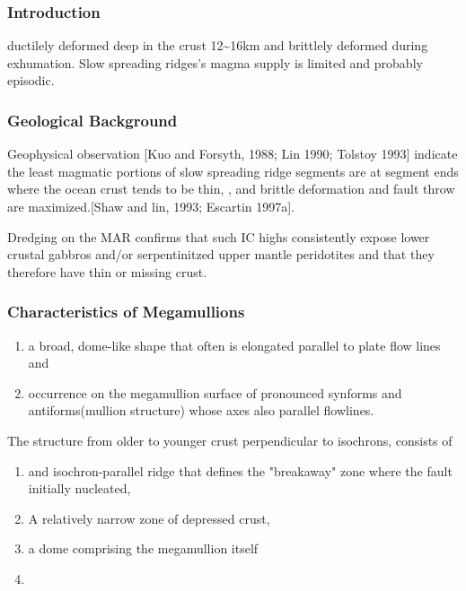 \documentclass[11pt]{article}
\begin{document}
\subsubsection{Introduction}
\label{sec-1-2-1}
ductilely deformed deep in the crust 12\textasciitilde{}16km and brittlely deformed during exhumation.
Slow spreading ridges's magma supply is limited and probably episodic.
\subsubsection{Geological Background}
\label{sec-1-2-2}
Geophysical observation [Kuo and Forsyth, 1988; Lin 1990; Tolstoy 1993] indicate the least magmatic portions of slow spreading ridge segments are at segment ends where the ocean crust tends to be thin, , and brittle deformation and fault throw are maximized.[Shaw and lin, 1993; Escartin 1997a].

Dredging on the MAR confirms that such IC highs consistently expose lower crustal gabbros and/or serpentinitzed upper mantle peridotites and that they therefore have thin or missing crust.
\subsubsection{Characteristics of Megamullions}
\label{sec-1-2-3}
\begin{enumerate}
\item a broad, dome-like shape that often is elongated parallel to plate flow lines and
\item occurrence on the megamullion surface of pronounced synforms and antiforms(mullion structure) whose axes also parallel flowlines. 
\end{enumerate}
The structure from older to younger crust perpendicular to isochrons, consists of 
\begin{enumerate}
\item and isochron-parallel ridge that defines the "breakaway" zone where the fault initially nucleated,
\item A relatively narrow zone of depressed crust,
\item a dome comprising the megamullion itself
\item {}
\end{enumerate}
\end{document}
